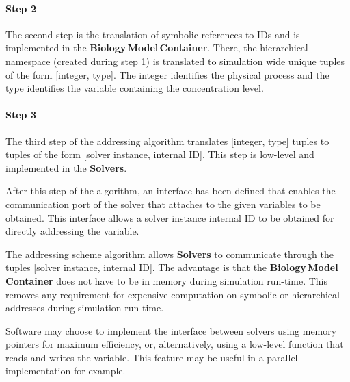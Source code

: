 \documentclass[11pt,3p,twocolumn]{JMN}
\begin{document}
\paragraph{Step 2} The second step is the translation of symbolic references to IDs and is implemented in the {\bf  Biology\,Model\,Container}. There, the hierarchical namespace (created during step 1) is translated to simulation wide unique tuples of the form [integer, type].  The integer identifies the physical process and the type identifies the variable containing the concentration level.



\paragraph{Step 3} The third step of the addressing algorithm translates [integer, type] tuples to tuples of the form [solver instance, internal ID].  This step is low-level and implemented in the {\bf Solvers}.

After this step of the algorithm, an interface has been defined that enables the communication port of the solver that attaches to the given variables to be obtained.  This interface allows a solver instance internal ID to be obtained for directly addressing the variable.

The addressing scheme algorithm allows {\bf Solvers} to communicate through the tuples [solver instance, internal ID].  The advantage is that the {\bf Biology\,Model\,Container} does not have to be in memory during simulation run-time.  This removes any requirement for expensive computation on symbolic or hierarchical addresses during simulation run-time.

Software may choose to implement the interface between solvers using memory pointers for maximum efficiency, or, alternatively, using a low-level function that reads and writes the variable.  This feature may be useful in a parallel implementation for example.

\end{document}
